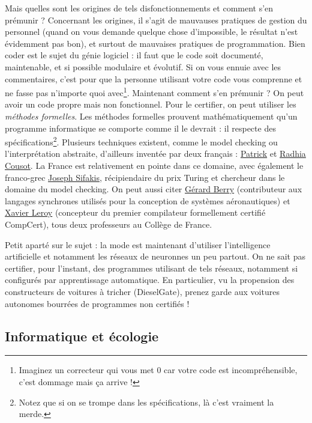 \documentclass[10pt]{article}
\begin{document}
Mais quelles sont les origines de tels disfonctionnements et comment s'en prémunir ? Concernant les origines, il s'agit de mauvauses pratiques de gestion du
personnel (quand on vous demande quelque chose d'impossible, le résultat n'est évidemment pas bon), et surtout de mauvaises pratiques de programmation.
Bien coder est le sujet du génie logiciel : il faut que le code soit documenté, maintenable, et si possible modulaire et évolutif. Si on vous ennuie
avec les commentaires, c'est pour que la personne utilisant votre code vous comprenne et ne fasse pas n'importe quoi avec\footnote{
  Imaginez un correcteur qui vous met $0$ car votre code est incompréhensible, c'est dommage mais ça arrive !
}. Maintenant comment s'en prémunir ? On peut avoir un code propre mais non fonctionnel. Pour le certifier, on peut utiliser les \emph{méthodes formelles}.
Les méthodes formelles prouvent mathématiquement qu'un programme informatique se comporte comme il le devrait : il respecte des spécifications\footnote{
  Notez que si on se trompe dans les spécifications, là c'est vraiment la merde.}. Plusieurs techniques existent, comme le model checking ou l'interprétation
abstraite, d'ailleurs inventée par deux français : \href{https://fr.wikipedia.org/wiki/Patrick_Cousot}{Patrick} et
\href{https://fr.wikipedia.org/wiki/Radhia_Cousot}{Radhia Cousot}. La France est relativement en pointe dans ce domaine, avec également le franco-grec
\href{https://fr.wikipedia.org/wiki/Joseph_Sifakis}{Joseph Sifakis}, récipiendaire du prix Turing et chercheur dans le domaine du model checking.
On peut aussi citer \href{https://fr.wikipedia.org/wiki/G\%C3\%A9rard_Berry}{Gérard Berry} (contributeur aux langages synchrones utilisés
pour la conception de systèmes aéronautiques) et \href{https://fr.wikipedia.org/wiki/Xavier_Leroy}{Xavier Leroy} (concepteur du premier compilateur
formellement certifié CompCert), tous deux professeurs au Collège de France.

Petit aparté sur le sujet : la mode est maintenant d'utiliser l'intelligence artificielle et notamment les réseaux de neuronnes un peu partout.
On ne sait pas certifier, pour l'instant, des programmes utilisant de tels réseaux, notamment si configurés par apprentissage automatique.
En particulier, vu la propension des constructeurs de voitures à tricher (DieselGate),
prenez garde aux voitures autonomes bourrées de programmes non certifiés !



\subsection{Informatique et écologie}
\end{document}
